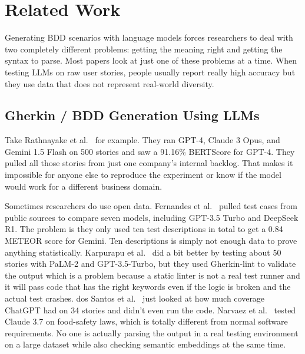 
\section{Related Work}
\label{sec:related}

Generating BDD scenarios with language models forces researchers to deal with two completely different problems: getting the meaning right and getting the syntax to parse. Most papers look at just one of these problems at a time. When testing LLMs on raw user stories, people usually report really high accuracy but they use data that does not represent real-world diversity. 

\subsection{Gherkin / BDD Generation Using LLMs}
\label{subsec:rw-gherkin}

Take Rathnayake et al.~\cite{rathnayake2026bddgeneration} for example. They ran GPT-4, Claude 3 Opus, and Gemini 1.5 Flash on 500 stories and saw a 91.16\% BERTScore for GPT-4. They pulled all those stories from just one company's internal backlog. That makes it impossible for anyone else to reproduce the experiment or know if the model would work for a different business domain.

Sometimes researchers do use open data. Fernandes et al.~\cite{fernandes2025gherkin} pulled test cases from public sources to compare seven models, including GPT-3.5 Turbo and DeepSeek R1. The problem is they only used ten test descriptions in total to get a 0.84 METEOR score for Gemini. Ten descriptions is simply not enough data to prove anything statistically. Karpurapu et al.~\cite{karpurapu2024bddautomation} did a bit better by testing about 50 stories with PaLM-2 and GPT-3.5-Turbo, but they used Gherkin-lint to validate the output which is a problem because a static linter is not a real test runner and it will pass code that has the right keywords even if the logic is broken and the actual test crashes. dos Santos et al.~\cite{dossantos2025bddtestgeneration} just looked at how much coverage ChatGPT had on 34 stories and didn't even run the code. Narvaez et al.~\cite{narvaez2025lawtogherkin} tested Claude 3.7 on food-safety laws, which is totally different from normal software requirements. No one is actually parsing the output in a real testing environment on a large dataset while also checking semantic embeddings at the same time.

